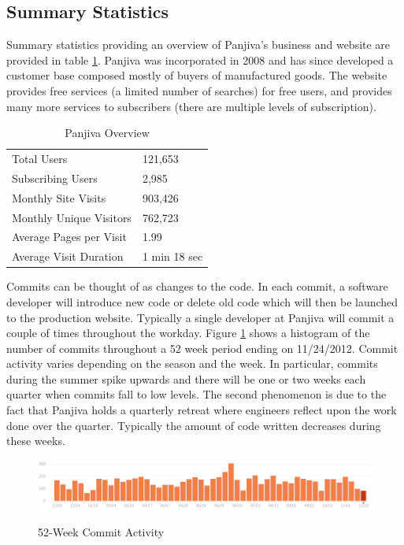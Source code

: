 \documentclass[10pt]{article}
\begin{document}
\subsection{Summary Statistics}

Summary statistics providing an overview of Panjiva's business and website are provided in table \ref{table:panjiva-overview}. Panjiva was incorporated in 2008 and has since developed a customer base composed mostly of buyers of manufactured goods. The website provides free services (a limited number of searches) for free users, and provides many more services to subscribers (there are multiple levels of subscription). 

\begin{table}[h!]
\centering
\caption{Panjiva Overview}
\begin{tabular}{l || l}
\hline
Total Users & 121,653 \\
Subscribing Users & 2,985 \\
Monthly Site Visits & 903,426 \\
Monthly Unique Visitors & 762,723 \\
Average Pages per Visit & 1.99 \\
Average Visit Duration & 1 min 18 sec \\
\hline
\end{tabular}
\label{table:panjiva-overview}
\end{table}

Commits can be thought of as changes to the code. In each commit, a software developer will introduce new code or delete old code which will then be launched to the production website. Typically a single developer at Panjiva will commit a couple of times throughout the workday. Figure \ref{fig:commit-history} shows a histogram of the number of commits throughout a 52 week period ending on 11/24/2012. Commit activity varies depending on the season and the week. In particular, commits during the summer spike upwards and there will be one or two weeks each quarter when commits fall to low levels. The second phenomenon is due to the fact that Panjiva holds a quarterly retreat where engineers reflect upon the work done over the quarter. Typically the amount of code written decreases during these weeks. 

\begin{figure}[h!]
\centering
\caption{52-Week Commit Activity}
\includegraphics[width=5in]{pictures/commit-activity.png}
\label{fig:commit-history}
\end{figure}
\end{document}
